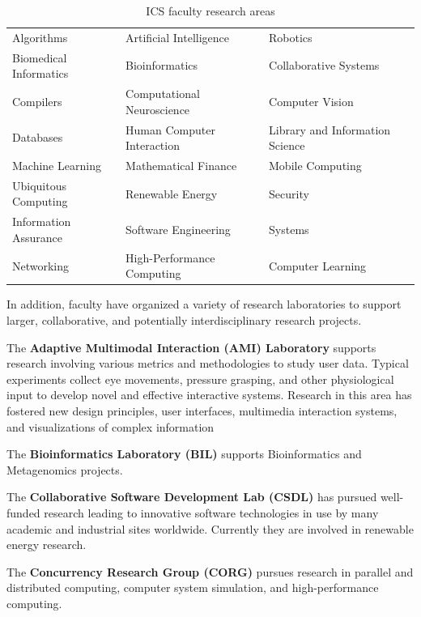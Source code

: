 \documentclass[12pt]{article}
\begin{document}
\begin{table}[htbp]
\begin{center}
\caption{ICS faculty research areas}
\label{fig:research-areas}
\begin{tabular}{|lll|} \hline
 Algorithms & Artificial Intelligence & Robotics \\
 Biomedical Informatics & Bioinformatics & Collaborative Systems \\
 Compilers & Computational Neuroscience & Computer Vision \\
 Databases & Human Computer Interaction & Library and Information Science \\
 Machine Learning & Mathematical Finance & Mobile Computing \\
 Ubiquitous Computing & Renewable Energy & Security \\
 Information Assurance & Software Engineering & Systems \\
 Networking & High-Performance Computing & Computer Learning \\ \hline
\end{tabular}
\end{center}
\end{table}

In addition, faculty have organized a variety of research laboratories to
support larger, collaborative, and potentially interdisciplinary research
projects.

\medskip\noindent The {\bf Adaptive Multimodal Interaction (AMI) Laboratory} supports
research involving various metrics and methodologies to study user
data. Typical experiments collect eye movements, pressure grasping, and
other physiological input to develop novel and effective interactive
systems.  Research in this area has fostered new design principles, user
interfaces, multimedia interaction systems, and visualizations of complex
information

\medskip\noindent The {\bf Bioinformatics Laboratory (BIL)} supports Bioinformatics and
Metagenomics projects.

\medskip\noindent The {\bf Collaborative Software Development Lab (CSDL)} has pursued
well-funded research leading to innovative software technologies in use by
many academic and industrial sites worldwide.  Currently they are involved
in renewable energy research. 

\medskip\noindent The {\bf Concurrency Research Group (CORG)} pursues research in  parallel
and distributed computing, computer system simulation, and high-performance
computing.
\end{document}
